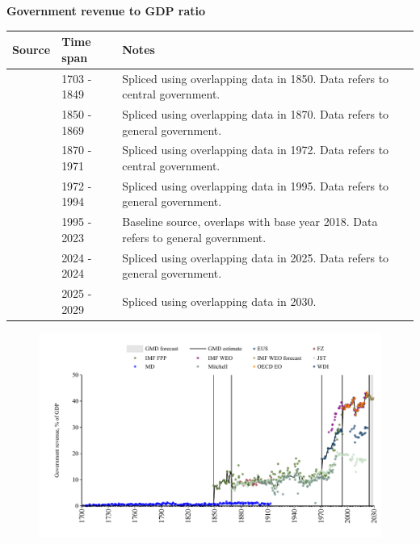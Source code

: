 \documentclass[12pt,a4paper,landscape]{article}
\begin{document}
\begin{adjustbox}{max totalsize={\paperwidth}{\paperheight},center}
\begin{minipage}[t][\textheight][t]{\textwidth}
\vspace*{0.5cm}
{}
\begin{center}
{\Large\bfseries Government revenue to GDP ratio}
\end{center}
\vspace{0.5cm}
\begin{table}[H]
\centering
\small
\begin{tabular}{|l|l|l|}
\hline
\textbf{Source} & \textbf{Time span} & \textbf{Notes} \\
\hline
\rowcolor{white}\cite{MD}& 1703 - 1849 &Spliced using overlapping data in 1850. Data refers to central government.\\
\rowcolor{lightgray}\cite{IMF_FPP}& 1850 - 1869 &Spliced using overlapping data in 1870. Data refers to general government.\\
\rowcolor{white}\cite{JST}& 1870 - 1971 &Spliced using overlapping data in 1972. Data refers to central government.\\
\rowcolor{lightgray}\cite{WDI}& 1972 - 1994 &Spliced using overlapping data in 1995. Data refers to general government.\\
\rowcolor{white}\cite{OECD_EO}& 1995 - 2023 &Baseline source, overlaps with base year 2018. Data refers to general government.\\
\rowcolor{lightgray}\cite{EUS}& 2024 - 2024 &Spliced using overlapping data in 2025. Data refers to general government.\\
\rowcolor{white}\cite{IMF_WEO_forecast}& 2025 - 2029 &Spliced using overlapping data in 2030. \\
\hline
\end{tabular}
\end{table}
\begin{figure}[H]
\centering
\includegraphics[width=\textwidth,height=0.6\textheight,keepaspectratio]{graphs/ESP_govrev_GDP.pdf}
\end{figure}
\end{minipage}
\end{adjustbox}
\end{document}
